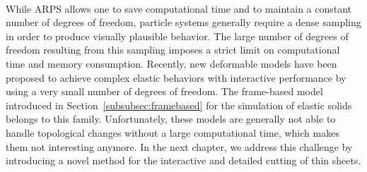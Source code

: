 \paragraph*{}
While ARPS allows one to save computational time and to maintain a constant number of degrees of freedom,
particle systems generally require a dense sampling in order to produce visually plausible behavior.
The large number of degrees of freedom resulting from this sampling imposes a strict limit on computational time and memory consumption.
Recently, new deformable models have been proposed to achieve complex elastic behaviors with interactive performance by using a very small number of degrees of freedom. 
The frame-based model introduced in Section~\ref{subsubsec:framebased} for the simulation of elastic solids belongs to this family.
Unfortunately, these models are generally not able to handle topological changes without a large computational time, which makes them not interesting anymore.
In the next chapter, we address this challenge by introducing a novel method for the interactive and detailed cutting of thin sheets.
